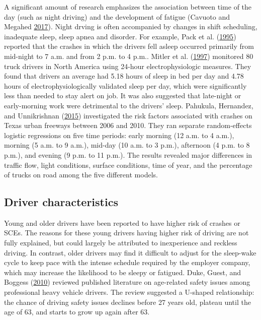 \documentclass[12pt]{book}
\numberwithin{equation}{chapter}
\begin{document}
A significant amount of research emphasizes the association between time of the day (such as night driving) and the development of fatigue (Cavuoto and Megahed \protect\hyperlink{ref-cavuoto2017understanding}{2017}). Night drving is often accompanied by changes in shift scheduling, inadequate sleep, sleep apnea and disorder. For example, Pack et al. (\protect\hyperlink{ref-pack1995characteristics}{1995}) reported that the crashes in which the drivers fell asleep occurred primarily from mid-night to 7 a.m. and from 2 p.m. to 4 p.m.. Mitler et al. (\protect\hyperlink{ref-mitler1997sleep}{1997}) monitored 80 truck drivers in North America using 24-hour electrophysiologic measures. They found that drivers an average had 5.18 hours of sleep in bed per day and 4.78 hours of electrophysiologically validated sleep per day, which were significantly less than needed to stay alert on job. It was also suggested that late-night or early-morning work were detrimental to the drivers' sleep. Pahukula, Hernandez, and Unnikrishnan (\protect\hyperlink{ref-pahukula2015time}{2015}) investigated the risk factors associated with crashes on Texas urban freeways between 2006 and 2010. They ran separate random-effects logistic regressions on five time periods: early morning (12 a.m. to 4 a.m.), morning (5 a.m. to 9 a.m.), mid-day (10 a.m. to 3 p.m.), afternoon (4 p.m. to 8 p.m.), and evening (9 p.m. to 11 p.m.). The results revealed major differences in traffic flow, light conditions, surface conditions, time of year, and the percentage of trucks on road among the five different models.

\hypertarget{driver-characteristics}{%
\subsection{Driver characteristics}\label{driver-characteristics}}

Young and older drivers have been reported to have higher risk of crashes or SCEs. The reasons for these young drivers having higher risk of driving are not fully explained, but could largely be attributed to inexperience and reckless driving. In contrast, older drivers may find it difficult to adjust for the sleep-wake cycle to keep pace with the intense schedule required by the employer company, which may increase the likelihood to be sleepy or fatigued. Duke, Guest, and Boggess (\protect\hyperlink{ref-duke2010age}{2010}) reviewed published literature on age-related safety issues among professional heavy vehicle drivers. The review suggested a U-shaped relationship: the chance of driving safety issues declines before 27 years old, plateau until the age of 63, and starts to grow up again after 63.
\end{document}
